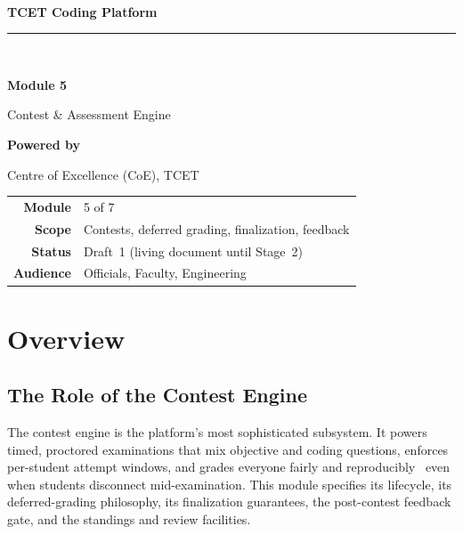 \documentclass[12pt,a4paper,oneside]{report}
\begin{document}
\begin{titlepage}\centering
\vspace*{1.4cm}{\color{tcetaccent}\rule{\linewidth}{1.2pt}}\\[0.5cm]
{\LARGE\bfseries TCET Coding Platform\par}
{\color{tcetaccent}\rule{\linewidth}{1.2pt}}\\[1.4cm]
{\Huge\bfseries\color{tcetblue} Module 5\par}\vspace{0.3cm}
{\Huge Contest \& Assessment Engine\par}\vspace{2.2cm}
{\large\bfseries Powered by\par}{\Large\color{tcetblue} Centre of Excellence (CoE), TCET\par}\vfill
\begin{tabular}{rl}\textbf{Module} & 5 of 7\\[3pt]
\textbf{Scope} & Contests, deferred grading, finalization, feedback\\[3pt]
\textbf{Status} & Draft~1 (living document until Stage~2)\\[3pt]
\textbf{Audience} & Officials, Faculty, Engineering\\\end{tabular}
\vspace{0.8cm}{\small\itshape \today\par}\end{titlepage}
\tableofcontents\clearpage{}

\chapter{Overview}
\section{The Role of the Contest Engine}
The contest engine is the platform's most sophisticated subsystem. It powers
timed, proctored examinations that mix objective and coding questions, enforces
per-student attempt windows, and grades everyone fairly and reproducibly \textemdash\
even when students disconnect mid-examination. This module specifies its
lifecycle, its deferred-grading philosophy, its finalization guarantees, the
post-contest feedback gate, and the standings and review facilities.
\end{document}
